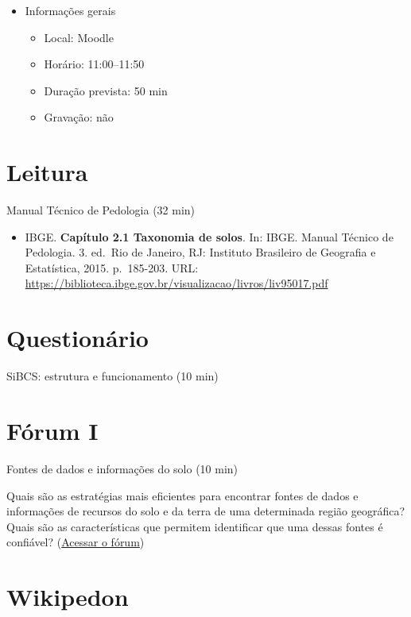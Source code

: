 \documentclass[
  11pt,
  a4paper,
  dvipsnames]{tufte-book}
\providecommand{\tightlist}{%
  \setlength{\itemsep}{0pt}\setlength{\parskip}{0pt}}
\begin{document}
\begin{itemize}
\tightlist
\item
  Informações gerais

  \begin{itemize}
  \tightlist
  \item
    Local: Moodle
  \item
    Horário: 11:00--11:50
  \item
    Duração prevista: 50 min
  \item
    Gravação: não
  \end{itemize}
\end{itemize}

\hypertarget{leitura-2}{%
\section{Leitura}\label{leitura-2}}

Manual Técnico de Pedologia (32 min)

\begin{itemize}
\tightlist
\item
  IBGE. \textbf{Capítulo 2.1 Taxonomia de solos}. In: IBGE. Manual Técnico de Pedologia. 3. ed.~Rio de Janeiro, RJ: Instituto Brasileiro de Geografia e Estatística, 2015. p.~185-203. URL: \url{https://biblioteca.ibge.gov.br/visualizacao/livros/liv95017.pdf}
\end{itemize}

\hypertarget{questionuxe1rio-3}{%
\section{Questionário}\label{questionuxe1rio-3}}

SiBCS: estrutura e funcionamento (10 min)

\hypertarget{fuxf3rum-i-2}{%
\section{Fórum I}\label{fuxf3rum-i-2}}

Fontes de dados e informações do solo (10 min)

Quais são as estratégias mais eficientes para encontrar fontes de dados e informações de recursos do solo e da terra de uma determinada região geográfica? Quais são as características que permitem identificar que uma dessas fontes é confiável? (\href{https://moodle.utfpr.edu.br/mod/forum/view.php?id=549655}{Acessar o fórum})

\hypertarget{wikipedon-2}{%
\section{Wikipedon}\label{wikipedon-2}}
\end{document}
